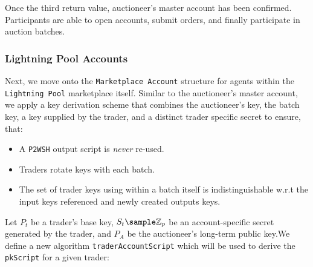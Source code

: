 \documentclass[10pt,a4paper]{article}
\theoremstyle{definition}
\begin{document}
Once the third return value, auctioneer's master account has been confirmed.
Participants are able to open accounts, submit orders, and finally participate
in auction batches.


\subsubsection{Lightning Pool Accounts}

Next, we move onto the \texttt{Marketplace Account} structure for agents within
the \texttt{Lightning Pool} marketplace itself. Similar to the auctioneer's
master account, we apply a key derivation scheme that combines the auctioneer's
key, the batch key, a key supplied by the trader, and a distinct trader
specific secret to ensure, that:
\begin{itemize}
    \item A \texttt{P2WSH} output script is \emph{never} re-used.
    \item Traders rotate keys with each batch.
    \item The set of trader keys using within a batch itself is
        indistinguishable w.r.t the input keys referenced and newly created
        outputs keys.
\end{itemize}

Let $P_{t}$ be a trader's base key, $S_{t} \sample \mathbb{Z}_{p}$ be an
account-specific secret generated by the trader, and $P_{A}$ be the
auctioneer's long-term public key.We define a new algorithm
\texttt{traderAccountScript} which will be used to derive the \texttt{pkScript}
for a given trader:

\begin{pcvstack}[boxed,center, space=1em]
\end{pcvstack}
\end{document}
